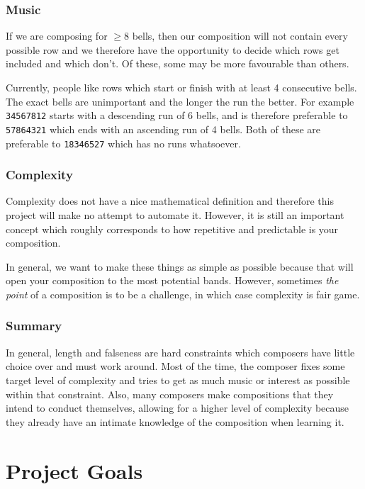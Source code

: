 \documentclass[12pt]{article}
\newcommand{\row}[1]{\texttt{#1}}
\begin{document}
\subsubsection{Music}

If we are composing for $\ge 8$ bells, then our composition will not contain every possible row and
we therefore have the opportunity to decide which rows get included and which don't.  Of these, some
may be more favourable than others.

Currently, people like rows which start or finish with at least 4 consecutive bells.  The exact bells
are unimportant and the longer the run the better.  For example \row{34567812} starts with a
descending run of 6 bells, and is therefore preferable to \row{57864321} which ends with an
ascending run of 4 bells.  Both of these are preferable to \row{18346527} which has no runs
whatsoever.

\subsubsection{Complexity}

Complexity does not have a nice mathematical definition and therefore this project will make no
attempt to automate it.  However, it is still an important concept which roughly corresponds to how
repetitive and predictable is your composition.

In general, we want to make these things as simple as possible because that will open your
composition to the most potential bands.  However, sometimes \emph{the point} of a composition is to
be a challenge, in which case complexity is fair game.

\subsubsection{Summary}

In general, length and falseness are hard constraints which composers have little choice over and
must work around.  Most of the time, the composer fixes some target level of complexity and tries
to get as much music or interest as possible within that constraint.  Also, many composers make
compositions that they intend to conduct themselves, allowing for a higher level of complexity
because they already have an intimate knowledge of the composition when learning it.



\pagebreak

\section{Project Goals}\label{sec:design-goals}
\end{document}
